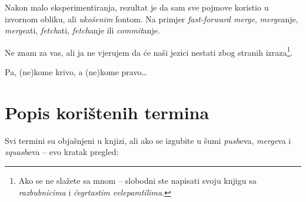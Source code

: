 Nakon malo eksperimentiranja, rezultat je da sam sve pojmove koristio u izvornom obliku, ali \emph{ukošenim} fontom. Na primjer \emph{fast-forward merge}, \emph{merge}anje, \emph{merge}ati, \emph{fetch}ati, \emph{fetch}anje ili \emph{commit}anje.

Ne znam za vas, ali ja ne vjerujem da će naši jezici nestati zbog stranih izraza\footnote{Ako se ne slažete sa mnom -- slobodni ste napisati svoju knjigu sa \emph{razbubnicima} i \emph{čegrtastim velepamtilima}.}.

Pa, (ne)kome krivo, a (ne)kome pravo\dots

\section*{Popis korištenih termina}

Svi termini su objašnjeni u knjizi, ali ako se izgubite u šumi \emph{push}eva, \emph{merge}va i \emph{squash}eva -- evo kratak pregled:

